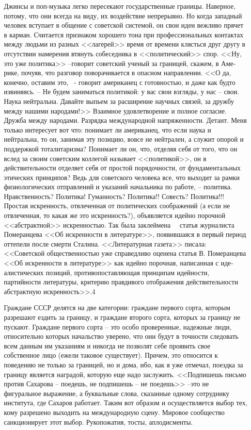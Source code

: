 \documentclass{book}
\begin{document}
Джинсы и поп-музыка легко пересекают государственные границы. Наверное, потому, что они всегда на виду, их воздей­ствие непрерывно. Но когда западный человек вступает в об­щение с советской системой, он свои идеи вежливо прячет в карман. Считается признаком хорошего тона при професси­ональных контактах между людьми из разных <<лагерей>> время от времени клясться друг другу в отсутствии намерения втя­нуть собеседника в <<политический>> спор. <<Ну, это уже политика>> --говорит советский ученый за границей, скажем, в Аме­рике, почуяв, что разговор поворачивается в опасном направ­лении. <<О да, конечно, оставим это, ~- говорит американец с готовностью, и даже как будто извиняясь. -- Не будем зани­маться политикой: у вас свои взгляды, у нас -- свои. Наука нейтральна. Давайте выпьем за расширение научных связей, за дружбу между нашими народами!>> Взаимное удовлетворе­ние и полное согласие. Дружба между народами. Разрядка меж­дународной напряженности. Детант. Меня только интересует вот что: понимает ли американец, 
что 
если наука и нейтральна, то он, занимая эту позицию, вовсе не нейтрален, а служит опо­рой и поддержкой тоталитаризма? Понимает ли он, что, отделяя себя от того, что он вслед за своим советским коллегой назы­вает <<политикой>>, он в действительности отделяет себя от простой порядочности, от фундаментальных этических прин­ципов? Ведь для советского человека все, что выходит за рамки физиологических отправлений и указаний начальника по рабо­те, -- политика. Нравственность? Политика! Гуманность? По­литика!! Совесть? Политика!!! Простая искренность, отвлечен­ная от политических соображений (а если не отвлеченная, то какая же это искренность?), объявляется идейно порочной <<абстрактной>> искренностью. Так была заклеймена   статья журналиста Померанцева <<Об искренности в литературе>>, по­явившаяся в первый период оттепели после смерти Сталина. <<Литературная газета>> писала: <<Советской общественностью уже справедливо оценена статья В. Померанцева <<Об искрен­ности в литературе>> как идейно порочная, написанная с 
иде­алистических позиций, противопоставляющая принципам идей­ности, партийности литературы, критерию правдивого отобра­жения действительности абстрактную искренность>>.4

Граждане СССР делятся на две категории: граждане перво­го сорта, которым разрешают ездить за границу, и граждане второго сорта, которых за границу не пускают. Граждане пер­вого сорта -- это особо проверенные, надежные люди, относи­тельно которых начальство уверено, что они будут в точности следовать всем данным им указаниям и никогда не позволят себе проявить свое собственное лицо (ежели таковое существует). Причем, это относится к поведению не только за границей, но и дома, ибо, как я уже отмечал, поездка за границу является наградой, которую еще надо заслужить. <<Подпишешь письмо против Сахарова -- поедешь, не подпишешь -- не пое­дешь>> --это не фигуральное выражение, а буквальные слова, сказанные одному сотруднику института, где Сахаров рабо­тает. Таким вот образом и осуществляется выбор тех, кому разрешено выходить на международную сцену. Мировое сооб­щество санкционирует этот выбор. Рукопожатия, тосты, апло­дисменты.
\end{document}
